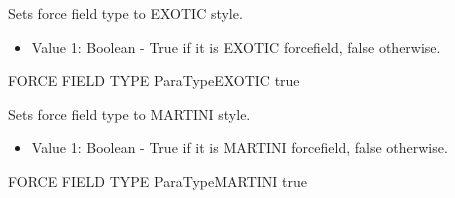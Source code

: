 \documentclass[letterpaper,10pt,english]{sphinxmanual}
\begin{document}
\begin{description}
\item[{}] \leavevmode
Sets force field type to EXOTIC style.
\begin{itemize}
\item {} 
Value 1: Boolean - True if it is EXOTIC forcefield, false otherwise.

\end{itemize}

%
\begin{sphinxVerbatim}[commandchars=\\\{\}]
\PYGZsh{}\PYGZsh{}\PYGZsh{}\PYGZsh{}\PYGZsh{}\PYGZsh{}\PYGZsh{}\PYGZsh{}\PYGZsh{}\PYGZsh{}\PYGZsh{}\PYGZsh{}\PYGZsh{}\PYGZsh{}\PYGZsh{}\PYGZsh{}\PYGZsh{}\PYGZsh{}\PYGZsh{}\PYGZsh{}\PYGZsh{}\PYGZsh{}\PYGZsh{}\PYGZsh{}\PYGZsh{}\PYGZsh{}\PYGZsh{}\PYGZsh{}\PYGZsh{}\PYGZsh{}\PYGZsh{}\PYGZsh{}\PYGZsh{}
\PYGZsh{} FORCE FIELD TYPE
\PYGZsh{}\PYGZsh{}\PYGZsh{}\PYGZsh{}\PYGZsh{}\PYGZsh{}\PYGZsh{}\PYGZsh{}\PYGZsh{}\PYGZsh{}\PYGZsh{}\PYGZsh{}\PYGZsh{}\PYGZsh{}\PYGZsh{}\PYGZsh{}\PYGZsh{}\PYGZsh{}\PYGZsh{}\PYGZsh{}\PYGZsh{}\PYGZsh{}\PYGZsh{}\PYGZsh{}\PYGZsh{}\PYGZsh{}\PYGZsh{}\PYGZsh{}\PYGZsh{}\PYGZsh{}\PYGZsh{}\PYGZsh{}\PYGZsh{}
ParaTypeEXOTIC true
\end{sphinxVerbatim}

\item[{}] \leavevmode
Sets force field type to MARTINI style.
\begin{itemize}
\item {} 
Value 1: Boolean - True if it is MARTINI forcefield, false otherwise.

\end{itemize}

%
\begin{sphinxVerbatim}[commandchars=\\\{\}]
\PYGZsh{}\PYGZsh{}\PYGZsh{}\PYGZsh{}\PYGZsh{}\PYGZsh{}\PYGZsh{}\PYGZsh{}\PYGZsh{}\PYGZsh{}\PYGZsh{}\PYGZsh{}\PYGZsh{}\PYGZsh{}\PYGZsh{}\PYGZsh{}\PYGZsh{}\PYGZsh{}\PYGZsh{}\PYGZsh{}\PYGZsh{}\PYGZsh{}\PYGZsh{}\PYGZsh{}\PYGZsh{}\PYGZsh{}\PYGZsh{}\PYGZsh{}\PYGZsh{}\PYGZsh{}\PYGZsh{}\PYGZsh{}\PYGZsh{}
\PYGZsh{} FORCE FIELD TYPE
\PYGZsh{}\PYGZsh{}\PYGZsh{}\PYGZsh{}\PYGZsh{}\PYGZsh{}\PYGZsh{}\PYGZsh{}\PYGZsh{}\PYGZsh{}\PYGZsh{}\PYGZsh{}\PYGZsh{}\PYGZsh{}\PYGZsh{}\PYGZsh{}\PYGZsh{}\PYGZsh{}\PYGZsh{}\PYGZsh{}\PYGZsh{}\PYGZsh{}\PYGZsh{}\PYGZsh{}\PYGZsh{}\PYGZsh{}\PYGZsh{}\PYGZsh{}\PYGZsh{}\PYGZsh{}\PYGZsh{}\PYGZsh{}\PYGZsh{}
ParaTypeMARTINI true
\end{sphinxVerbatim}


\end{description}
\end{document}

